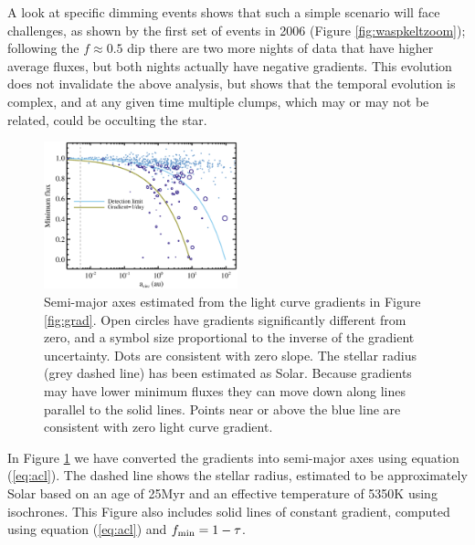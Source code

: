\documentclass[useAMS,usenatbib,usegraphicx]{mn2e}
\begin{document}
A look at specific dimming events shows that such a simple scenario will face challenges,
as shown by the first set of events in 2006 (Figure \ref{fig:waspkeltzoom}); following
the $f \approx 0.5$ dip there are two more nights of data that have higher average
fluxes, but both nights actually have negative gradients. This evolution does not
invalidate the above analysis, but shows that the temporal evolution is complex, and at
any given time multiple clumps, which may or may not be related, could be occulting the
star.

\begin{figure}
  \begin{center}
    \hspace{-0.5cm} \includegraphics[width=0.5\textwidth]{figs/sma.eps}
    \caption{Semi-major axes estimated from the light curve gradients in Figure
      \ref{fig:grad}. Open circles have gradients significantly different from zero, and
      a symbol size proportional to the inverse of the gradient uncertainty. Dots are
      consistent with zero slope. The stellar radius (grey dashed line) has been
      estimated as Solar. Because gradients may have lower minimum fluxes they can move
      down along lines parallel to the solid lines. Points near or above the blue line
      are consistent with zero light curve gradient.}\label{fig:sma}
  \end{center}
\end{figure}

In Figure \ref{fig:sma} we have converted the gradients into semi-major axes using
equation (\ref{eq:acl}). The dashed line shows the stellar radius, estimated to be
approximately Solar based on an age of 25Myr \citep{2013AstL...39..776P} and an effective
temperature of 5350K \citep{2014A&A...563A.139P} using \citet{2000A&A...358..593S}
isochrones. This Figure also includes solid lines of constant gradient, computed using
equation (\ref{eq:acl}) and $f_{\rm min} = 1-\tau$.
\end{document}
